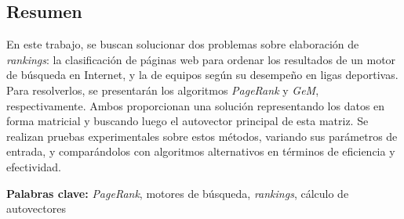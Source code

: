 \documentclass[11pt, a4paper, spanish]{article}
\let\strong\textbf
\theoremstyle{plain}
\theoremstyle{remark}
\begin{document}


\maketitle
\newpage

\begin{addmargin}[4em]{4em}

\section*{\centering Resumen}

En este trabajo, se buscan solucionar dos problemas sobre elaboración de \emph{rankings}: la clasificación de páginas web para ordenar los resultados de un motor de búsqueda en Internet, y la de equipos según su desempeño en ligas deportivas. Para resolverlos, se presentarán los algoritmos \emph{PageRank} y \emph{GeM}, respectivamente. Ambos proporcionan una solución representando los datos en forma matricial y buscando luego el autovector principal de esta matriz. Se realizan pruebas experimentales sobre estos métodos, variando sus parámetros de entrada, y comparándolos con algoritmos alternativos en términos de eficiencia y efectividad.

\vspace{4em}
\noindent \strong{Palabras clave:} \emph{PageRank}, motores de búsqueda, \emph{rankings}, cálculo de autovectores

\end{addmargin}
\clearpage

\tableofcontents
\clearpage


\clearpage

\clearpage

\clearpage
% 

\clearpage

\begin{appendices}
    
    \clearpage
\end{appendices}
\clearpage

\printbibliography[heading=bibintoc]
\end{document}
